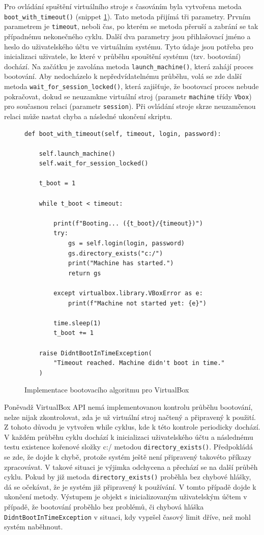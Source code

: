 \documentclass[thesis=M,czech,hidelinks]{FITthesis}[2013/05/06]
\begin{document}
Pro ovládání spuštění virtuálního stroje s časováním byla vytvořena metoda \texttt{boot_with_timeout()} (snippet \ref{snip:vboxboot}). Tato metoda přijímá tři parametry. Prvním parametrem je \texttt{timeout}, neboli čas, po kterém se metoda přeruší a zabrání se tak případnému nekonečného cyklu. Další dva parametry jsou přihlašovací jméno a heslo do uživatelského účtu ve virtuálním systému. Tyto údaje jsou potřeba pro inicializaci uživatele, ke které v průběhu spouštění systému (tzv. bootování) dochází. Na začátku je zavolána metoda \texttt{launch_machine()}, která zahájí proces bootování. Aby nedocházelo k nepředvídatelnému průběhu, volá se zde další metoda \texttt{wait_for_session_locked()}, která zajišťuje, že bootovací proces nebude pokračovat, dokud se neuzamkne virtuální stroj (parametr \texttt{machine} třídy \texttt{Vbox}) pro současnou relaci (parametr \texttt{session}). Při ovládání stroje skrze neuzamčenou relaci může nastat chyba a následné ukončení skriptu. 
\begin{figure}[h]               
	\begin{verbatim}
def boot_with_timeout(self, timeout, login, password):

    self.launch_machine()
    self.wait_for_session_locked()

    t_boot = 1

    while t_boot < timeout:

        print(f"Booting... ({t_boot}/{timeout})")
        try:
            gs = self.login(login, password)
            gs.directory_exists("c:/")
            print("Machine has started.")
            return gs

        except virtualbox.library.VBoxError as e:
            print(f"Machine not started yet: {e}")

        time.sleep(1)
        t_boot += 1

    raise DidntBootInTimeException(
        "Timeout reached. Machine didn't boot in time."
    )
	\end{verbatim}      
	\caption{Implementace bootovacího algoritmu pro VirtualBox}
	\label{snip:vboxboot}
\end{figure}


Poněvadž VirtualBox API nemá implementovanou kontrolu průběhu bootování, nelze nijak zkontrolovat, zda je už virtuální stroj načtený a připravený k použití. Z tohoto důvodu je vytvořen while cyklus, kde k této kontrole periodicky dochází. V každém průběhu cyklu dochází k inicializaci uživatelského účtu a následnému testu existence kořenové složky c:/ metodou \texttt{directory_exists()}. Předpokládá se zde, že dojde k chybě, protože systém ještě není připravený takovéto příkazy zpracovávat. V takové situaci je výjimka odchycena a přechází se na další průběh cyklu. Pokud by již metoda \texttt{directory_exists()} proběhla bez chybové hlášky, dá se očekávat, že je systém již připravený k používání. V tomto případě dojde k ukončení metody. Výstupem je objekt s inicializovaným uživatelským účtem v případě, že bootování proběhlo bez problémů, či chybová hláška \texttt{DidntBootInTimeException} v situaci, kdy vypršel časový limit dříve, než mohl systém naběhnout.
\end{document}
